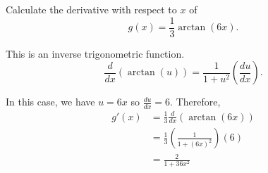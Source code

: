 \documentclass{ximera}
\author{Emma Smith Zbarsky}
\begin{document}
\begin{exercise}

Calculate the derivative with respect to $x$ of
\[g(x) = \frac{1}{3}\arctan(6x).\]


\begin{hint}
This is an inverse trigonometric function.
\[\frac{d}{dx}\left(\arctan(u)\right) = \frac{1}{1+u^2}\left(\frac{du}{dx}\right).\]
\end{hint}


\begin{hint}
In this case, we have $u= 6x$ so $\frac{du}{dx} = 6$. Therefore,
\begin{align*}
g'(x) &= \frac{1}{3}\frac{d}{dx}\left(\arctan(6x)\right) \\
&= \frac{1}{3}\left(\frac{1}{1+(6x)^2}\right)(6) \\
&= \frac{2}{1+36x^2}
\end{align*}
\end{hint}


\begin{multipleChoice}
\end{multipleChoice}

\end{exercise}
\end{document}
